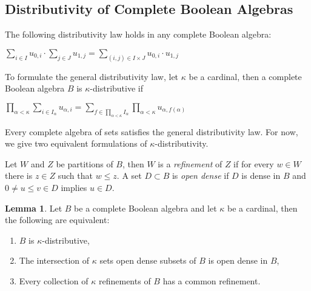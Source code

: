 \documentclass[8pt]{article}
\theoremstyle{definition}
\theoremstyle{definition}
\theoremstyle{definition}
\theoremstyle{definition}
\theoremstyle{definition}
\theoremstyle{definition}
\theoremstyle{definition}
\theoremstyle{definition}
\newtheorem{lemma}{Lemma}[section]
\theoremstyle{definition}
\theoremstyle{definition}
\theoremstyle{definition}
\theoremstyle{definition}
\theoremstyle{definition}
\theoremstyle{definition}
\theoremstyle{question}
\begin{document}
\subsection{Distributivity of Complete Boolean Algebras}

The following distributivity law holds in any complete Boolean algebra:
\begin{center}
  $\sum \limits_{i \in I} u_{0,i} \cdot \sum \limits_{j \in J} u_{1, j} = \sum \limits_{(i, j) \in I \times J} u_{0,i} \cdot u_{1, j}$
\end{center}

To formulate the general distributivity law, let $\kappa$ be a cardinal, then a complete Boolean algebra $B$
is \emph{$\kappa$}-distributive if
\begin{center}
  $\prod \limits_{\alpha < \kappa} \sum \limits_{i \in I_{\alpha}} u_{\alpha, i} = \sum \limits_{f \in \prod \limits_{\alpha < \kappa} I_{\alpha}} \prod \limits_{\alpha < \kappa} u_{\alpha, f(\alpha)}$
\end{center}

Every complete algebra of sets satisfies the general distributivity law. For now, we give two equivalent
formulations of \emph{$\kappa$}-distributivity.

Let $W$ and $Z$ be partitions of $B$, then $W$ is a \emph{refinement} of $Z$ if for every $w \in W$
there is $z \in Z$ such that $w \leq z$. A set $D \subset B$ is \emph{open dense} if $D$ is dense in $B$
and $0 \neq u \leq v \in D$ implies $u \in D$.

\begin{lemma} Let $B$ be a complete Boolean algebra and let $\kappa$ be a cardinal, then the following are equivalent:
  \begin{enumerate}
    \item $B$ is $\kappa$-distributive,
    \item The intersection of $\kappa$ sets open dense subsets of $B$ is open dense in $B$,
    \item Every collection of $\kappa$ refinements of $B$ has a common refinement.
  \end{enumerate}
\end{lemma}
\end{document}
